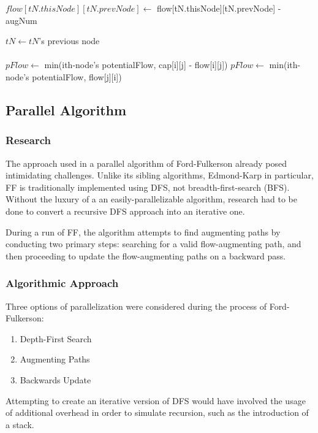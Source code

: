 \begin{algorithmic}
                \Else \State $flow[tN.thisNode][tN.prevNode] \gets$ flow[tN.thisNode][tN.prevNode] - augNum
                    
                \EndIf
                
                \State $tN \gets tN$'s previous node
            \EndWhile
        \EndFunction\\\\

            	\State 
            	    $pFlow \gets$ min(ith-node's potentialFlow, cap[i][j] - flow[i][j])
            \Else
                \State
			        $pFlow \gets$ min(ith-node's potentialFlow, flow[j][i])
            \EndIf
        \EndFunction
    \end{algorithmic}
\subsection{Parallel Algorithm}
    \subsubsection{Research}
        The approach used in a parallel algorithm of Ford-Fulkerson already posed intimidating challenges. Unlike its sibling algorithms, Edmond-Karp in particular, FF is traditionally implemented using DFS, not breadth-first-search (BFS). Without the luxury of a an easily-parallelizable algorithm, research had to be done to convert a recursive DFS approach into an iterative one.
        
        During a run of FF, the algorithm attempts to find augmenting paths by conducting two primary steps: searching for a valid flow-augmenting path, and then proceeding to update the flow-augmenting paths on a backward pass.
        
        
    \subsubsection{Algorithmic Approach}
        Three options of parallelization were considered during the process of Ford-Fulkerson:
        \begin{enumerate}
            \item Depth-First Search
            \item Augmenting Paths
            \item Backwards Update
        \end{enumerate}
        Attempting to create an iterative version of DFS would have involved the usage of additional overhead in order to simulate recursion, such as the introduction of a stack.
        
